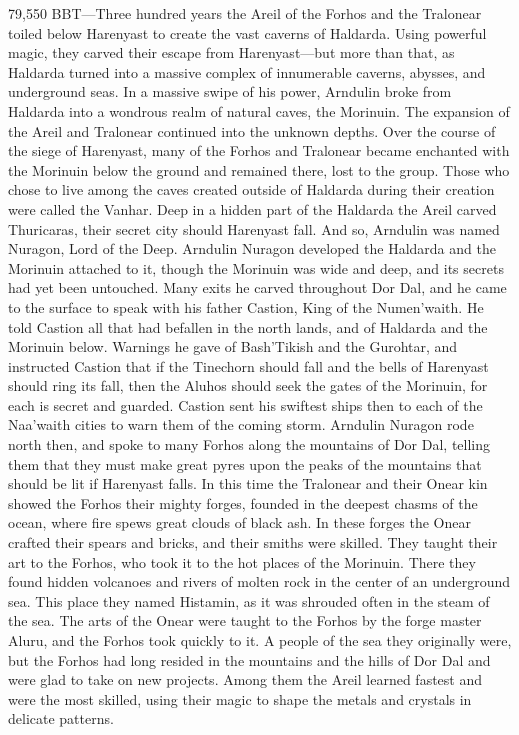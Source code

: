 \documentclass[smalldemyvopaper,11pt,twoside,onecolumn,openright,extrafontsizes]{memoir}
\begin{document}
{{79,550 BBT—Three hundred years the Areil of the Forhos and the Tralonear toiled below Harenyast to create the vast caverns of Haldarda. Using powerful magic, they carved their escape from Harenyast—but more than that, as Haldarda turned into a massive complex of innumerable caverns, abysses, and underground seas. In a massive swipe of his power, Arndulin broke from Haldarda into a wondrous realm of natural caves, the Morinuin. The expansion of the Areil and Tralonear continued into the unknown depths. Over the course of the siege of Harenyast, many of the Forhos and Tralonear became enchanted with the Morinuin below the ground and remained there, lost to the group. Those who chose to live among the caves created outside of Haldarda during their creation were called the Vanhar. Deep in a hidden part of the Haldarda the Areil carved Thuricaras, their secret city should Harenyast fall. And so, Arndulin was named Nuragon, Lord of the Deep. Arndulin Nuragon developed the Haldarda and the Morinuin attached to it, though the Morinuin was wide and deep, and its secrets had yet been untouched. Many exits he carved throughout Dor Dal, and he came to the surface to speak with his father Castion, King of the Numen’waith. He told Castion all that had befallen in the north lands, and of Haldarda and the Morinuin below. Warnings he gave of Bash’Tikish and the Gurohtar, and instructed Castion that if the Tinechorn should fall and the bells of Harenyast should ring its fall, then the Aluhos should seek the gates of the Morinuin, for each is secret and guarded. Castion sent his swiftest ships then to each of the Naa’waith cities to warn them of the coming storm. Arndulin Nuragon rode north then, and spoke to many Forhos along the mountains of Dor Dal, telling them that they must make great pyres upon the peaks of the mountains that should be lit if Harenyast falls.
	In this time the Tralonear and their Onear kin showed the Forhos their mighty forges, founded in the deepest chasms of the ocean, where fire spews great clouds of black ash. In these forges the Onear crafted their spears and bricks, and their smiths were skilled. They taught their art to the Forhos, who took it to the hot places of the Morinuin. There they found hidden volcanoes and rivers of molten rock in the center of an underground sea. This place they named Histamin, as it was shrouded often in the steam of the sea. The arts of the Onear were taught to the Forhos by the forge master Aluru, and the Forhos took quickly to it. A people of the sea they originally were, but the Forhos had long resided in the mountains and the hills of Dor Dal and were glad to take on new projects. Among them the Areil learned fastest and were the most skilled, using their magic to shape the metals and crystals in delicate patterns. 

}}
\end{document}
